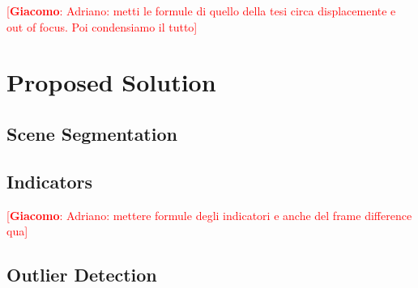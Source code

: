 \documentclass{llncs}
\newcommand{\gi}[1]{{\textcolor{red}{[\small \textbf{Giacomo}: #1]}}}
\begin{document}
\gi{Adriano: metti le formule di quello della tesi circa displacemente e out of focus. Poi condensiamo il tutto}

\section{Proposed Solution}\label{sec:propSol}

\subsection{Scene Segmentation}\label{subsec:Segmentation}

\subsection{Indicators}\label{subsec:Indicators}
\gi{Adriano: mettere formule degli indicatori e anche del frame difference qua}

\subsection{Outlier Detection}\label{subsec:MonitoringScheme}
\end{document}
